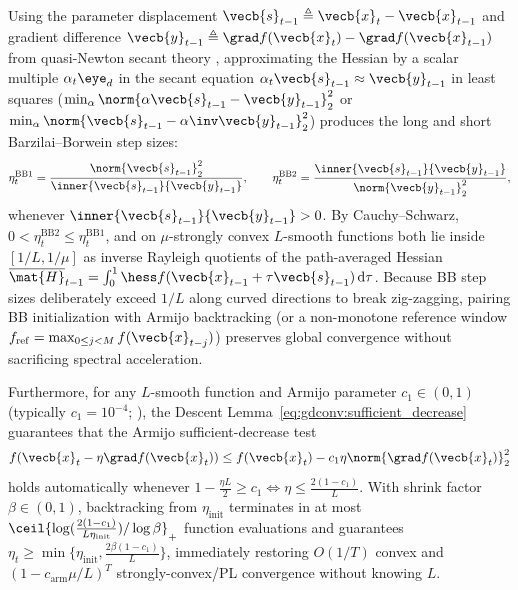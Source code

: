 \documentclass[../../../../master.tex]{subfiles}
\begin{document}
Using the parameter displacement $\vecb{s}_{t-1} \triangleq \vecb{x}_t - \vecb{x}_{t-1}$ and gradient difference $\vecb{y}_{t-1} \triangleq \grad f(\vecb{x}_t) - \grad f(\vecb{x}_{t-1})$ from quasi-Newton secant theory , approximating the Hessian by a scalar multiple $\alpha_t \eye_d$ in the secant equation $\alpha_t \vecb{s}_{t-1} \approx \vecb{y}_{t-1}$ in least squares ($\min_{\alpha} \norm{\alpha\vecb{s}_{t-1} - \vecb{y}_{t-1}}_2^2$ or $\min_{\alpha} \norm{\vecb{s}_{t-1} - \alpha\inv \vecb{y}_{t-1}}_2^2$) produces the long and short Barzilai--Borwein step sizes:
\begin{equation}
\label{eq:gdconv:bb_step}
  \eta_t^{\mathrm{BB1}} = \frac{\norm{\vecb{s}_{t-1}}_2^2}{\inner{\vecb{s}_{t-1}}{\vecb{y}_{t-1}}}, \qquad
  \eta_t^{\mathrm{BB2}} = \frac{\inner{\vecb{s}_{t-1}}{\vecb{y}_{t-1}}}{\norm{\vecb{y}_{t-1}}_2^2},
\end{equation}
whenever $\inner{\vecb{s}_{t-1}}{\vecb{y}_{t-1}} > 0$. By Cauchy--Schwarz, $0 < \eta_t^{\mathrm{BB2}} \le \eta_t^{\mathrm{BB1}}$, and on $\mu$-strongly convex $L$-smooth functions both lie inside $[1/L, 1/\mu]$ as inverse Rayleigh quotients of the path-averaged Hessian $\overline{\mat{H}}_{t-1} = \int_0^1 \hess f(\vecb{x}_{t-1} + \tau\vecb{s}_{t-1})\,\mathrm{d}\tau$. Because BB step sizes deliberately exceed $1/L$ along curved directions to break zig-zagging, pairing BB initialization with Armijo backtracking (or a non-monotone reference window $f_{\mathrm{ref}} = \max_{0 \le j < M} f(\vecb{x}_{t-j})$) preserves global convergence without sacrificing spectral acceleration.

Furthermore, for any $L$-smooth function and Armijo parameter $c_1 \in (0, 1)$ (typically $c_1 = 10^{-4}$; ), the Descent Lemma~\eqref{eq:gdconv:sufficient_decrease} guarantees that the Armijo sufficient-decrease test
\begin{equation}
\label{eq:gdconv:armijo}
  f(\vecb{x}_t - \eta\grad f(\vecb{x}_t)) \le f(\vecb{x}_t) - c_1 \eta \norm{\grad f(\vecb{x}_t)}_2^2
\end{equation}
holds automatically whenever $1 - \frac{\eta L}{2} \ge c_1 \iff \eta \le \frac{2(1 - c_1)}{L}$. With shrink factor $\beta \in (0, 1)$, backtracking from $\eta_{\mathrm{init}}$ terminates in at most $\ceil{\log(\frac{2(1-c_1)}{L\eta_{\mathrm{init}}}) / \log \beta}_+$ function evaluations and guarantees $\eta_t \ge \min\{\eta_{\mathrm{init}}, \frac{2\beta(1-c_1)}{L}\}$, immediately restoring $O(1/T)$ convex and $(1 - c_{\mathrm{arm}}\mu/L)^T$ strongly-convex/PL convergence without knowing $L$.
\end{document}
